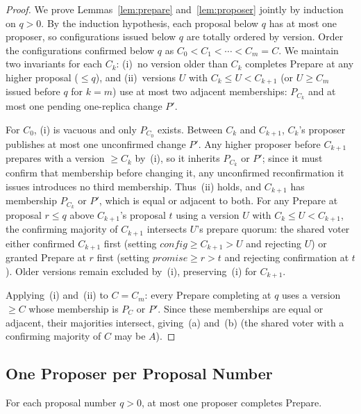 \documentclass[sigconf,nonacm]{acmart}
\begin{document}
\begin{proof}
We prove Lemmas~\ref{lem:prepare} and~\ref{lem:proposer} jointly by
induction on \(q>0\). By the induction hypothesis, each proposal below
\(q\) has at most one proposer, so configurations issued below \(q\) are
totally ordered by version. Order the configurations confirmed below
\(q\) as \(C_0<C_1<\cdots<C_m=C\). We maintain two invariants for each \(C_k\): (i)~no version older than
\(C_k\) completes Prepare at any higher proposal (\(\le q\)), and
(ii)~versions \(U\) with \(C_k\le U<C_{k+1}\) (or \(U\ge C_m\) issued
before \(q\) for \(k=m\)) use at most two adjacent memberships:
\(P_{C_k}\) and at most one pending one-replica change \(P'\).

For \(C_0\), (i) is vacuous and only \(P_{C_0}\) exists. Between \(C_k\)
and \(C_{k+1}\), \(C_k\)'s proposer publishes at most one unconfirmed
change \(P'\). Any higher proposer before \(C_{k+1}\) prepares with a
version \(\ge C_k\) by~(i), so it inherits \(P_{C_k}\) or \(P'\); since
it must confirm that membership before changing it, any unconfirmed
reconfirmation it issues introduces no third membership. Thus~(ii)
holds, and \(C_{k+1}\) has membership \(P_{C_k}\) or \(P'\), which is
equal or adjacent to both. For any Prepare at proposal \(r\le q\) above
\(C_{k+1}\)'s proposal \(t\) using a version \(U\) with
\(C_k\le U<C_{k+1}\), the confirming majority of \(C_{k+1}\) intersects
\(U\)'s prepare quorum: the shared voter either confirmed \(C_{k+1}\)
first (setting \(\mathit{config}\ge C_{k+1}>U\) and rejecting \(U\)) or
granted Prepare at \(r\) first (setting \(\mathit{promise}\ge r>t\) and
rejecting confirmation at \(t\)). Older versions remain excluded by~(i),
preserving~(i) for \(C_{k+1}\).

Applying~(i) and~(ii) to \(C=C_m\): every Prepare completing at \(q\)
uses a version \(\ge C\) whose membership is \(P_C\) or \(P'\). Since
these memberships are equal or adjacent, their majorities intersect,
giving~(a) and~(b) (the shared voter with a confirming majority of \(C\)
may be \(A\)).
\end{proof}

\subsection{One Proposer per Proposal Number}
\label{sec:proposer}
\begin{lemma}\label{lem:proposer}
For each proposal number \(q>0\), at most one proposer completes Prepare.
\end{lemma}
\end{document}

